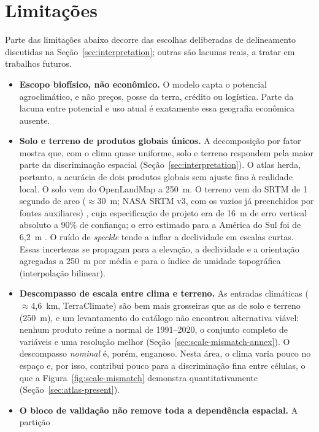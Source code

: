\section{Limitações}\label{sec:limitations}

Parte das limitações abaixo decorre das escolhas deliberadas de delineamento discutidas na
Seção~\ref{sec:interpretation}; outras são lacunas reais, a tratar em trabalhos futuros.

\begin{itemize}
  \item \textbf{Escopo biofísico, não econômico.} O modelo capta o potencial agroclimático, e não
    preços, posse da terra, crédito ou logística. Parte da lacuna entre potencial e uso atual é
    exatamente essa geografia econômica ausente.
  \item \textbf{Solo e terreno de produtos globais únicos.} A decomposição por fator mostra que,
    com o clima quase uniforme, solo e terreno respondem pela maior parte da discriminação espacial
    (Seção~\ref{sec:interpretation}). O atlas herda, portanto, a acurácia de dois produtos globais
    sem ajuste fino à realidade local. O solo vem do OpenLandMap a 250~m. O terreno vem do SRTM de
    1 segundo de arco ($\approx$30~m; NASA SRTM v3, com os vazios já preenchidos por fontes
    auxiliares) \citep{farr_shuttle_2007}, cuja especificação de projeto era de 16~m de erro vertical
    absoluto a 90\% de confiança; o erro estimado para a América do Sul foi de 6,2~m
    \citep[Tabela~1, p.~21]{farr_shuttle_2007}. O ruído de \emph{speckle} tende a inflar a declividade
    em escalas curtas. Essas incertezas se propagam para a elevação, a declividade e a orientação
    agregadas a 250~m por média e para o índice de umidade topográfica (interpolação bilinear).
  \item \textbf{Descompasso de escala entre clima e terreno.} As entradas climáticas
    ($\approx$4,6~km, TerraClimate) são bem mais grosseiras que as de solo e terreno (250~m), e um
    levantamento do catálogo não encontrou alternativa viável: nenhum produto reúne a normal de
    1991--2020, o conjunto completo de variáveis e uma resolução melhor
    (Seção~\ref{sec:scale-mismatch-annex}). O descompasso \emph{nominal} é, porém, enganoso. Nesta
    área, o clima varia pouco no espaço e, por isso, contribui pouco para a discriminação fina entre
    células, o que a Figura~\ref{fig:scale-mismatch} demonstra quantitativamente
    (Seção~\ref{sec:atlas-present}).
  \item \textbf{O bloco de validação não remove toda a dependência espacial.} A partição

\end{itemize}
